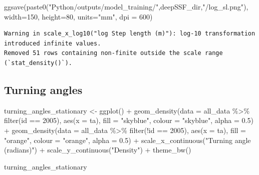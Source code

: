 \documentclass[
  letterpaper,
  DIV=11,
  numbers=noendperiod]{scrartcl}
\newenvironment{Shaded}{\begin{snugshade}}{\end{snugshade}}
\newcommand{\AttributeTok}[1]{\textcolor[rgb]{0.40,0.45,0.13}{#1}}
\newcommand{\DecValTok}[1]{\textcolor[rgb]{0.68,0.00,0.00}{#1}}
\newcommand{\FloatTok}[1]{\textcolor[rgb]{0.68,0.00,0.00}{#1}}
\newcommand{\FunctionTok}[1]{\textcolor[rgb]{0.28,0.35,0.67}{#1}}
\newcommand{\NormalTok}[1]{\textcolor[rgb]{0.00,0.23,0.31}{#1}}
\newcommand{\OtherTok}[1]{\textcolor[rgb]{0.00,0.23,0.31}{#1}}
\newcommand{\SpecialCharTok}[1]{\textcolor[rgb]{0.37,0.37,0.37}{#1}}
\newcommand{\StringTok}[1]{\textcolor[rgb]{0.13,0.47,0.30}{#1}}
\begin{document}
\begin{Shaded}
\begin{Highlighting}[]
\FunctionTok{ggsave}\NormalTok{(}\FunctionTok{paste0}\NormalTok{(}\StringTok{"Python/outputs/model\_training/"}\NormalTok{,deepSSF\_dir,}\StringTok{"/log\_sl.png"}\NormalTok{), }\AttributeTok{width=}\DecValTok{150}\NormalTok{, }\AttributeTok{height=}\DecValTok{80}\NormalTok{, }\AttributeTok{units=}\StringTok{"mm"}\NormalTok{, }\AttributeTok{dpi =} \DecValTok{600}\NormalTok{)}
\end{Highlighting}
\end{Shaded}

\begin{verbatim}
Warning in scale_x_log10("log Step length (m)"): log-10 transformation introduced infinite values.
Removed 51 rows containing non-finite outside the scale range
(`stat_density()`).
\end{verbatim}

\subsection{Turning angles}\label{turning-angles}

\begin{Shaded}
\begin{Highlighting}[]
\NormalTok{turning\_angles\_stationary }\OtherTok{\textless{}{-}} \FunctionTok{ggplot}\NormalTok{() }\SpecialCharTok{+}
  \FunctionTok{geom\_density}\NormalTok{(}\AttributeTok{data =}\NormalTok{ all\_data }\SpecialCharTok{\%\textgreater{}\%} \FunctionTok{filter}\NormalTok{(id }\SpecialCharTok{==} \DecValTok{2005}\NormalTok{),}
                 \FunctionTok{aes}\NormalTok{(}\AttributeTok{x =}\NormalTok{ ta),}
                 \AttributeTok{fill =} \StringTok{"skyblue"}\NormalTok{, }\AttributeTok{colour =} \StringTok{"skyblue"}\NormalTok{, }\AttributeTok{alpha =} \FloatTok{0.5}\NormalTok{) }\SpecialCharTok{+}
  \FunctionTok{geom\_density}\NormalTok{(}\AttributeTok{data =}\NormalTok{ all\_data }\SpecialCharTok{\%\textgreater{}\%} \FunctionTok{filter}\NormalTok{(}\SpecialCharTok{!}\NormalTok{id }\SpecialCharTok{==} \DecValTok{2005}\NormalTok{),}
                 \FunctionTok{aes}\NormalTok{(}\AttributeTok{x =}\NormalTok{ ta),}
                 \AttributeTok{fill =} \StringTok{"orange"}\NormalTok{, }\AttributeTok{colour =} \StringTok{"orange"}\NormalTok{, }\AttributeTok{alpha =} \FloatTok{0.5}\NormalTok{) }\SpecialCharTok{+}
  \FunctionTok{scale\_x\_continuous}\NormalTok{(}\StringTok{"Turning angle (radians)"}\NormalTok{) }\SpecialCharTok{+}
  \FunctionTok{scale\_y\_continuous}\NormalTok{(}\StringTok{"Density"}\NormalTok{) }\SpecialCharTok{+}
  \FunctionTok{theme\_bw}\NormalTok{()}

\NormalTok{turning\_angles\_stationary}
\end{Highlighting}
\end{Shaded}
\end{document}

